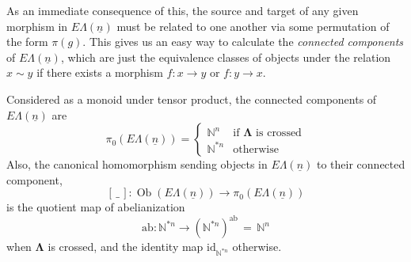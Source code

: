 \documentclass{amsbook} %
\newcommand{\id}{\textrm{id}}
\newcommand{\ML}{\mathbf{\Lambda}}
\newcommand{\ELn}{E\Lambda(\underline{n})}
\newcommand{\ob}{\operatorname{Ob}}
\numberwithin{section}{chapter}
\begin{document}
As an immediate consequence of this, the source and target of any given morphism in $\ELn$ must be related to one another via some permutation of the form $\pi(g)$. This gives us an easy way to calculate the \emph{connected components} of $\ELn$, which are just the equivalence classes of objects under the relation $x \sim y$ if there exists a morphism $f \colon  x \to y$ or $f \colon y \to x$.
\begin{prop}\label{Gnconcomp} Considered as a monoid under tensor product, the connected components of $\ELn$ are
\[ \pi_0(\ELn) = \begin{cases}
							 \mathbb{N}^n & \text{if $\ML$ is crossed} \\
							 \mathbb{N}^{\ast n} & \text{otherwise}
							\end{cases}
 \] 
Also, the canonical homomorphism sending objects in $\ELn$ to their connected component,
\[ [ \, \_ \, ] \colon \ob(\ELn) \to \pi_0(\ELn) \]
is the quotient map of abelianization
\[ \mathrm{ab} \colon \mathbb{N}^{*n} \to (\mathbb{N}^{*n})^{\mathrm{ab}} \, = \, \mathbb{N}^n \]
when $\ML$ is crossed, and the identity map $\id_{\mathbb{N}^{*n}}$ otherwise.
\end{prop}
\end{document}
